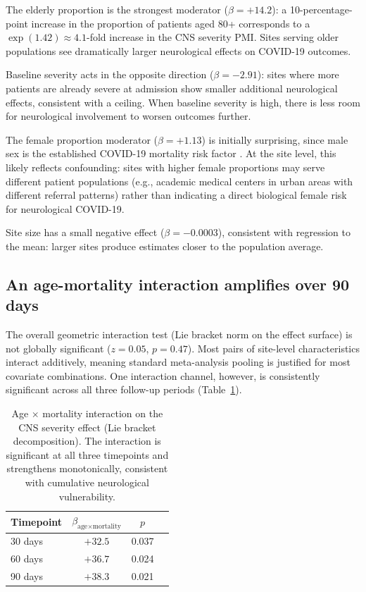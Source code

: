 \documentclass{article}
\begin{document}
The elderly proportion is the strongest moderator ($\beta = +14.2$): a 10-percentage-point increase in the proportion of patients aged 80+ corresponds to a $\exp(1.42) \approx 4.1$-fold increase in the CNS severity PMI. Sites serving older populations see dramatically larger neurological effects on COVID-19 outcomes.

Baseline severity acts in the opposite direction ($\beta = -2.91$): sites where more patients are already severe at admission show smaller additional neurological effects, consistent with a ceiling. When baseline severity is high, there is less room for neurological involvement to worsen outcomes further.

The female proportion moderator ($\beta = +1.13$) is initially surprising, since male sex is the established COVID-19 mortality risk factor \cite{takahashi2020sex, williamson2020opensafely}. At the site level, this likely reflects confounding: sites with higher female proportions may serve different patient populations (e.g., academic medical centers in urban areas with different referral patterns) rather than indicating a direct biological female risk for neurological COVID-19.

Site size has a small negative effect ($\beta = -0.0003$), consistent with regression to the mean: larger sites produce estimates closer to the population average.


\subsection{An age-mortality interaction amplifies over 90 days}

The overall geometric interaction test (Lie bracket norm on the effect surface) is not globally significant ($z = 0.05$, $p = 0.47$). Most pairs of site-level characteristics interact additively, meaning standard meta-analysis pooling is justified for most covariate combinations. One interaction channel, however, is consistently significant across all three follow-up periods (Table~\ref{tab:lie_bracket}).

\begin{table}[t]
\centering
\caption{Age $\times$ mortality interaction on the CNS severity effect (Lie bracket decomposition). The interaction is significant at all three timepoints and strengthens monotonically, consistent with cumulative neurological vulnerability.}
\label{tab:lie_bracket}
\begin{tabular}{lccc}
\toprule
Timepoint & $\beta_{\text{age} \times \text{mortality}}$ & $p$ \\
\midrule
30 days  & $+32.5$ & 0.037 \\
60 days  & $+36.7$ & 0.024 \\
90 days  & $+38.3$ & 0.021 \\
\bottomrule
\end{tabular}
\end{table}
\end{document}
